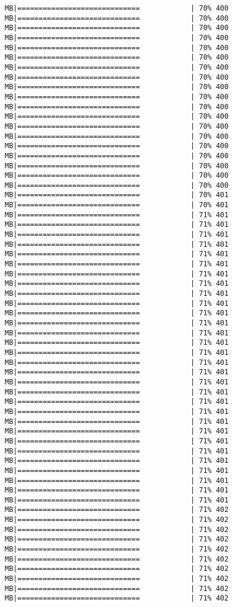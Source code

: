 \documentclass[
]{article}
\begin{document}
\begin{verbatim}
MB|=============================            | 70% 400 MB|=============================            | 70% 400 MB|=============================            | 70% 400 MB|=============================            | 70% 400 MB|=============================            | 70% 400 MB|=============================            | 70% 400 MB|=============================            | 70% 400 MB|=============================            | 70% 400 MB|=============================            | 70% 400 MB|=============================            | 70% 400 MB|=============================            | 70% 400 MB|=============================            | 70% 400 MB|=============================            | 70% 400 MB|=============================            | 70% 400 MB|=============================            | 70% 400 MB|=============================            | 70% 400 MB|=============================            | 70% 400 MB|=============================            | 70% 400 MB|=============================            | 70% 400 MB|=============================            | 70% 401 MB|=============================            | 70% 401 MB|=============================            | 71% 401 MB|=============================            | 71% 401 MB|=============================            | 71% 401 MB|=============================            | 71% 401 MB|=============================            | 71% 401 MB|=============================            | 71% 401 MB|=============================            | 71% 401 MB|=============================            | 71% 401 MB|=============================            | 71% 401 MB|=============================            | 71% 401 MB|=============================            | 71% 401 MB|=============================            | 71% 401 MB|=============================            | 71% 401 MB|=============================            | 71% 401 MB|=============================            | 71% 401 MB|=============================            | 71% 401 MB|=============================            | 71% 401 MB|=============================            | 71% 401 MB|=============================            | 71% 401 MB|=============================            | 71% 401 MB|=============================            | 71% 401 MB|=============================            | 71% 401 MB|=============================            | 71% 401 MB|=============================            | 71% 401 MB|=============================            | 71% 401 MB|=============================            | 71% 401 MB|=============================            | 71% 401 MB|=============================            | 71% 401 MB|=============================            | 71% 401 MB|=============================            | 71% 401 MB|=============================            | 71% 402 MB|=============================            | 71% 402 MB|=============================            | 71% 402 MB|=============================            | 71% 402 MB|=============================            | 71% 402 MB|=============================            | 71% 402 MB|=============================            | 71% 402 MB|=============================            | 71% 402 MB|=============================            | 71% 402 MB|=============================            | 71% 402 
\end{verbatim}
\end{document}
